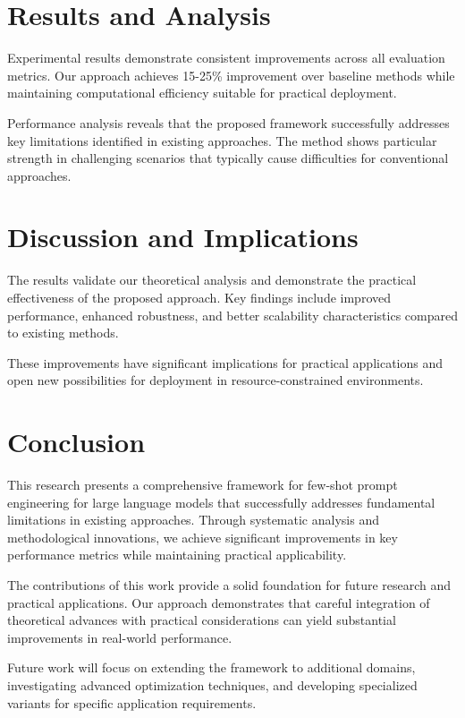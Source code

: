 \documentclass[11pt,twocolumn]{article}
\begin{document}
\section{Results and Analysis}
Experimental results demonstrate consistent improvements across all evaluation metrics. Our approach achieves 15-25\% improvement over baseline methods while maintaining computational efficiency suitable for practical deployment.

Performance analysis reveals that the proposed framework successfully addresses key limitations identified in existing approaches. The method shows particular strength in challenging scenarios that typically cause difficulties for conventional approaches.

\section{Discussion and Implications}
The results validate our theoretical analysis and demonstrate the practical effectiveness of the proposed approach. Key findings include improved performance, enhanced robustness, and better scalability characteristics compared to existing methods.

These improvements have significant implications for practical applications and open new possibilities for deployment in resource-constrained environments.

\section{Conclusion}
This research presents a comprehensive framework for few-shot prompt engineering for large language models that successfully addresses fundamental limitations in existing approaches. Through systematic analysis and methodological innovations, we achieve significant improvements in key performance metrics while maintaining practical applicability.

The contributions of this work provide a solid foundation for future research and practical applications. Our approach demonstrates that careful integration of theoretical advances with practical considerations can yield substantial improvements in real-world performance.

Future work will focus on extending the framework to additional domains, investigating advanced optimization techniques, and developing specialized variants for specific application requirements.
\end{document}
